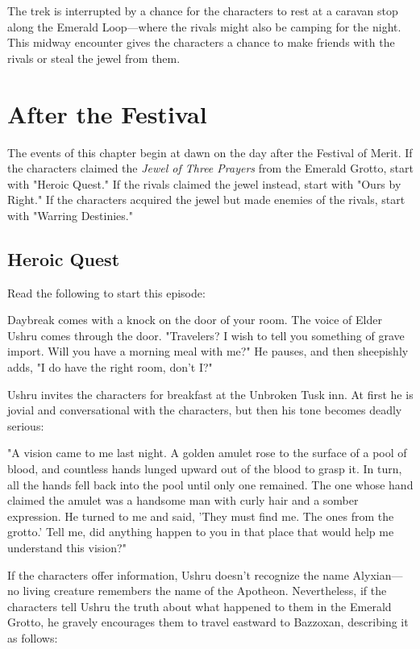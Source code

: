 \documentclass[10pt,a4paper,twoside,bg=print,twocolumn,openany,nodeprecatedcode]{dndbook}
\begin{document}
The trek is interrupted by a chance for the characters to rest at a caravan stop along the Emerald Loop—where the rivals might also be camping for the night. This midway encounter gives the characters a chance to make friends with the rivals or steal the jewel from them.

\section{After the Festival}
The events of this chapter begin at dawn on the day after the Festival of Merit. If the characters claimed the \textit{Jewel of Three Prayers} from the Emerald Grotto, start with "Heroic Quest." If the rivals claimed the jewel instead, start with "Ours by Right." If the characters acquired the jewel but made enemies of the rivals, start with "Warring Destinies."

\subsection{Heroic Quest}
Read the following to start this episode:

\begin{DndReadAloud}{}
Daybreak comes with a knock on the door of your room. The voice of Elder Ushru comes through the door. "Travelers? I wish to tell you something of grave import. Will you have a morning meal with me?" He pauses, and then sheepishly adds, "I do have the right room, don't I?"

\end{DndReadAloud}

Ushru invites the characters for breakfast at the Unbroken Tusk inn. At first he is jovial and conversational with the characters, but then his tone becomes deadly serious:

\begin{DndReadAloud}{}
"A vision came to me last night. A golden amulet rose to the surface of a pool of blood, and countless hands lunged upward out of the blood to grasp it. In turn, all the hands fell back into the pool until only one remained. The one whose hand claimed the amulet was a handsome man with curly hair and a somber expression. He turned to me and said, 'They must find me. The ones from the grotto.' Tell me, did anything happen to you in that place that would help me understand this vision?"

\end{DndReadAloud}

If the characters offer information, Ushru doesn't recognize the name Alyxian—no living creature remembers the name of the Apotheon. Nevertheless, if the characters tell Ushru the truth about what happened to them in the Emerald Grotto, he gravely encourages them to travel eastward to Bazzoxan, describing it as follows:
\end{document}
